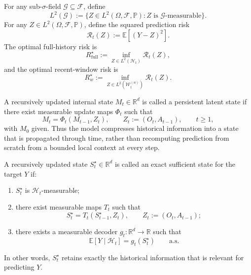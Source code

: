 \documentclass{llmxive}
\providecommand{\E}{\mathbb{E}}
\providecommand{\Prob}{\mathbb{P}}
\providecommand{\R}{\mathbb{R}}
\providecommand{\cF}{\mathcal{F}}
\providecommand{\cH}{\mathcal{H}}
\providecommand{\cW}{\mathcal{W}}
\begin{document}
\begin{definition}
\label{def:predictors_and_risks}
For any sub-$\sigma$-field $\mathcal G \subseteq \cF$, define
\[
L^2(\mathcal G)
:=
\bigl\{
Z \in L^2(\Omega,\cF,\Prob) : Z \text{ is } \mathcal G\text{-measurable}
\bigr\}.
\]
For any $Z \in L^2(\Omega,\cF,\Prob)$, define the squared prediction risk
\begin{equation}
\mathcal R_t(Z) := \E[(Y-Z)^2].
\label{eq:general_risk_def}
\end{equation}
The optimal full-history risk is
\begin{equation}
R_{\mathrm{full}}^\star
:=
\inf_{Z \in L^2(\cH_t)} \mathcal R_t(Z),
\label{eq:Rfull_def}
\end{equation}
and the optimal recent-window risk is
\begin{equation}
R_{w}^\star
:=
\inf_{Z \in L^2(\cW_t^{(w)})} \mathcal R_t(Z).
\label{eq:Rw_def}
\end{equation}
\end{definition}

\begin{definition}
\label{def:persistent_latent_state}
A recursively updated internal state $M_t \in \R^d$ is called a persistent latent state if there exist measurable update maps $\Phi_t$ such that
\begin{equation}
M_t = \Phi_t(M_{t-1}, Z_t),
\qquad
Z_t := (O_t,A_{t-1}),
\qquad t\ge 1,
\label{eq:persistent_state_update}
\end{equation}
with $M_0$ given.
Thus the model compresses historical information into a state that is propagated through time, rather than recomputing prediction from scratch from a bounded local context at every step.
\end{definition}

\begin{definition}
\label{def:exact_sufficient_state}
A recursively updated state $S_t^\star \in \R^d$ is called an exact sufficient state for the target $Y$ if:
\begin{enumerate}
    \item $S_t^\star$ is $\cH_t$-measurable;
    \item there exist measurable maps $T_t$ such that
    \begin{equation}
    S_t^\star = T_t(S_{t-1}^\star, Z_t),
    \qquad
    Z_t := (O_t,A_{t-1});
    \label{eq:exact_state_update}
    \end{equation}
    \item there exists a measurable decoder $g_t:\R^d\to\R$ such that
    \begin{equation}
    \E[Y\mid \cH_t] = g_t(S_t^\star)
    \qquad \text{a.s.}
    \label{eq:exact_sufficient_state}
    \end{equation}
\end{enumerate}
In other words, $S_t^\star$ retains exactly the historical information that is relevant for predicting $Y$.
\end{definition}
\end{document}

